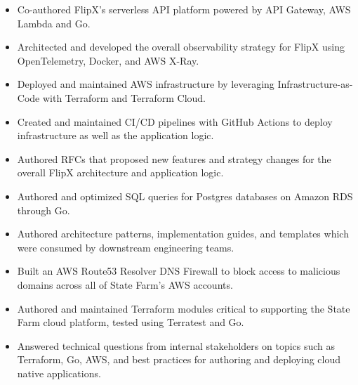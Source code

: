 \documentclass[10pt,a4paper,ragged2e,withhyper]{altacv}
\begin{document}

\makecvheader

\medskip


\begin{paracol}{2}



\begin{itemize}
\item Co-authored FlipX's serverless API platform powered by API Gateway, AWS Lambda and Go.
\item Architected and developed the overall observability strategy for FlipX using OpenTelemetry, Docker, and AWS X-Ray.
\item Deployed and maintained AWS infrastructure by leveraging Infrastructure-as-Code with Terraform and Terraform Cloud.
\item Created and maintained CI/CD pipelines with GitHub Actions to deploy infrastructure as well as the application logic.
\item Authored RFCs that proposed new features and strategy changes for the overall FlipX architecture and application logic.
\item Authored and optimized SQL queries for Postgres databases on Amazon RDS through Go.
\end{itemize}

\divider


\begin{itemize}
\item Authored architecture patterns, implementation guides, and templates which were consumed by downstream engineering teams.
\item Built an AWS Route53 Resolver DNS Firewall to block access to malicious domains across all of State Farm's AWS accounts.
\item Authored and maintained Terraform modules critical to supporting the State Farm cloud platform, tested using Terratest and Go.
\item Answered technical questions from internal stakeholders on topics such as Terraform, Go, AWS, and best practices for authoring and deploying cloud native applications.
\end{itemize}


\end{paracol}
\end{document}
